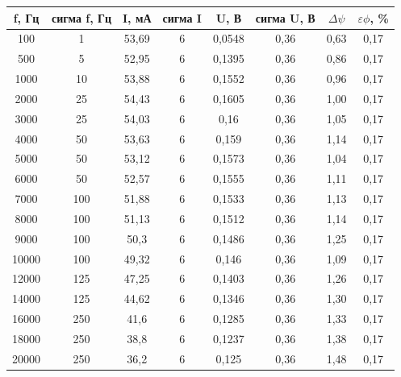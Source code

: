 \documentclass[a4paper,12pt]{report}
\begin{document}
\begin{table}[!ht]
\begin{tabular}{|c|c|c|c|c|c|c|c|}
\hline
f, Гц & сигма f, Гц & I, мА & сигма I & U, В   & сигма U, В & $\Delta \psi$ & $\varepsilon\phi$, \% \\ \hline
100   & 1           & 53,69 & 6       & 0,0548 & 0,36       & 0,63      & 0,17           \\ \hline
500   & 5           & 52,95 & 6       & 0,1395 & 0,36       & 0,86      & 0,17           \\ \hline
1000  & 10          & 53,88 & 6       & 0,1552 & 0,36       & 0,96      & 0,17           \\ \hline
2000  & 25          & 54,43 & 6       & 0,1605 & 0,36       & 1,00      & 0,17           \\ \hline
3000  & 25          & 54,03 & 6       & 0,16   & 0,36       & 1,05      & 0,17           \\ \hline
4000  & 50          & 53,63 & 6       & 0,159  & 0,36       & 1,14      & 0,17           \\ \hline
5000  & 50          & 53,12 & 6       & 0,1573 & 0,36       & 1,04      & 0,17           \\ \hline
6000  & 50          & 52,57 & 6       & 0,1555 & 0,36       & 1,11      & 0,17           \\ \hline
7000  & 100         & 51,88 & 6       & 0,1533 & 0,36       & 1,13      & 0,17           \\ \hline
8000  & 100         & 51,13 & 6       & 0,1512 & 0,36       & 1,14      & 0,17           \\ \hline
9000  & 100         & 50,3  & 6       & 0,1486 & 0,36       & 1,25      & 0,17           \\ \hline
10000 & 100         & 49,32 & 6       & 0,146  & 0,36       & 1,09      & 0,17           \\ \hline
12000 & 125         & 47,25 & 6       & 0,1403 & 0,36       & 1,26      & 0,17           \\ \hline
14000 & 125         & 44,62 & 6       & 0,1346 & 0,36       & 1,30      & 0,17           \\ \hline
16000 & 250         & 41,6  & 6       & 0,1285 & 0,36       & 1,33      & 0,17           \\ \hline
18000 & 250         & 38,8  & 6       & 0,1237 & 0,36       & 1,38      & 0,17           \\ \hline
20000 & 250         & 36,2  & 6       & 0,125  & 0,36       & 1,48      & 0,17           \\ \hline

\end{tabular}
\end{table}
\end{document}

